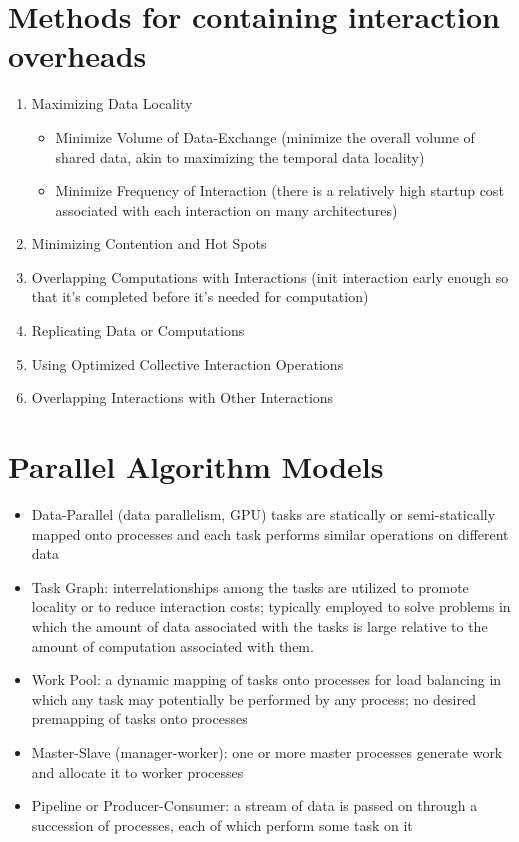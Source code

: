 \section*{Methods for containing interaction overheads}
\begin{enumerate}
\item Maximizing Data Locality
  \begin{itemize}
  \item Minimize Volume of Data-Exchange (minimize the overall volume of shared data, akin to maximizing the temporal data locality)
  \item Minimize Frequency of Interaction (there is a relatively high startup cost associated with each interaction on many architectures)
  \end{itemize}
\item Minimizing Contention and Hot Spots
\item Overlapping Computations with Interactions (init interaction early enough so that it's completed before it's needed for computation)
\item Replicating Data or Computations
\item Using Optimized Collective Interaction Operations
\item Overlapping Interactions with Other Interactions
\end{enumerate}
\section*{Parallel Algorithm Models}
\begin{itemize}
\item Data-Parallel (data parallelism, GPU) tasks are statically or semi-statically mapped onto processes and each task performs similar operations on different data
\item Task Graph: interrelationships among the tasks are utilized to promote locality or to reduce interaction costs; typically employed to solve problems in which the amount of data associated with the tasks is large relative to the amount of computation associated with them.
\item Work Pool: a dynamic mapping of tasks onto processes for load balancing in which any task may potentially be performed by any process; no desired premapping of tasks onto processes
\item Master-Slave (manager-worker): one or more master processes generate work and allocate it to worker processes
\item Pipeline or Producer-Consumer: a stream of data is passed on through a succession of processes, each of which perform some task on it
\end{itemize}
